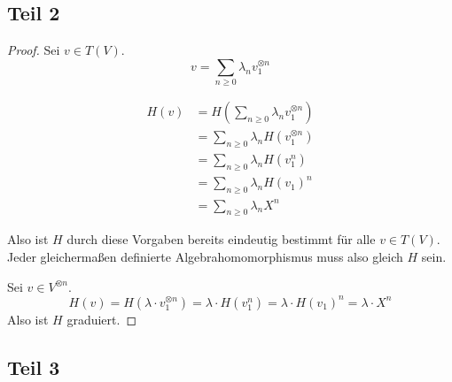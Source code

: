 \documentclass[10pt,a4paper]{article}
\begin{document}
\subsection*{Teil 2}

\begin{proof}
Sei $v \in T(V)$.
\begin{equation}
v = \sum_{n \ge 0} \lambda_{n} v_{1}^{\otimes n}
\end{equation}

\begin{align*}
H(v) & = H(\sum_{n \ge 0} \lambda_{n} v_{1}^{\otimes n})\\
& = \sum_{n \ge 0} \lambda_{n} H(v_{1}^{\otimes n})\\
& = \sum_{n \ge 0} \lambda_{n} H(v_{1}^{n})\\
& = \sum_{n \ge 0} \lambda_{n} H(v_{1})^{n}\\
& = \sum_{n \ge 0} \lambda_{n} X^{n}
\end{align*}

Also ist $H$ durch diese Vorgaben bereits eindeutig bestimmt für alle $v \in T(V)$.
Jeder gleichermaßen definierte Algebrahomomorphismus muss also gleich $H$ sein.

Sei $v \in V^{\otimes n}$.
\begin{equation}
H(v) = H(\lambda \cdot v_{1}^{\otimes n}) = \lambda \cdot H(v_{1}^{n}) = \lambda \cdot H(v_{1})^{n} = \lambda \cdot X^{n}
\end{equation}
Also ist $H$ graduiert.
\end{proof}

\subsection*{Teil 3}
\end{document}
